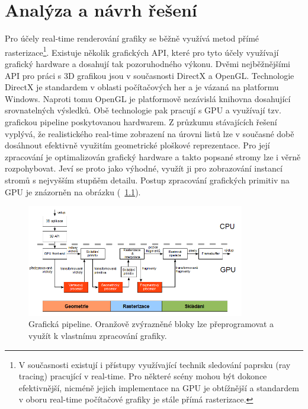 \chapter{Analýza a návrh řešení}
\label{chap:analyza}

Pro účely real-time renderování grafiky se běžně využívá metod přímé rasterizace\footnote{V současnosti existují i přístupy využívající technik sledování paprsku (ray tracing) pracující v real-time. Pro některé scény mohou být dokonce efektivnější, nicméně jejich implementace na GPU je obtížnější a standardem v oboru real-time počítačové grafiky je stále přímá rasterizace.}. Existuje několik grafických API, které pro tyto účely využívají grafický hardware a dosahují tak pozoruhodného výkonu. Dvěmi nejběžnějšími API pro práci s 3D grafikou jsou v současnosti DirectX a OpenGL. Technologie DirectX je standardem v oblasti počítačových her a je vázaná na platformu Windows. Naproti tomu OpenGL je platformově nezávislá knihovna dosahující srovnatelných výsledků. Obě technologie pak pracují s GPU a využívají tzv. grafickou pipeline poskytovanou hardwarem.
Z průzkumu stávajících řešení vyplývá, že realistického real-time zobrazení na úrovni listů lze v současné době dosáhnout efektivně využitím geometrické ploškové reprezentace. Pro její zpracování je optimalizován grafický hardware a takto popsané stromy lze i věrně rozpohybovat. Jeví se proto jako výhodné, využít ji pro zobrazování instancí stromů s nejvyšším stupňěm detailu. Postup zpracování grafických primitiv na GPU je znázorněn na obrázku (~\ref{fig:gpupipeline}).

\begin{figure}[!hbt]
\begin{center}
\includegraphics[width=0.85\textwidth]{./figures/GPUpipeline.png}
\end{center}
\caption[Grafická pipeline]%
{Grafická pipeline. Oranžově zvýrazněné bloky lze přeprogramovat a využít k vlastnímu zpracování grafiky.
\label{fig:gpupipeline}
}
\end{figure}


